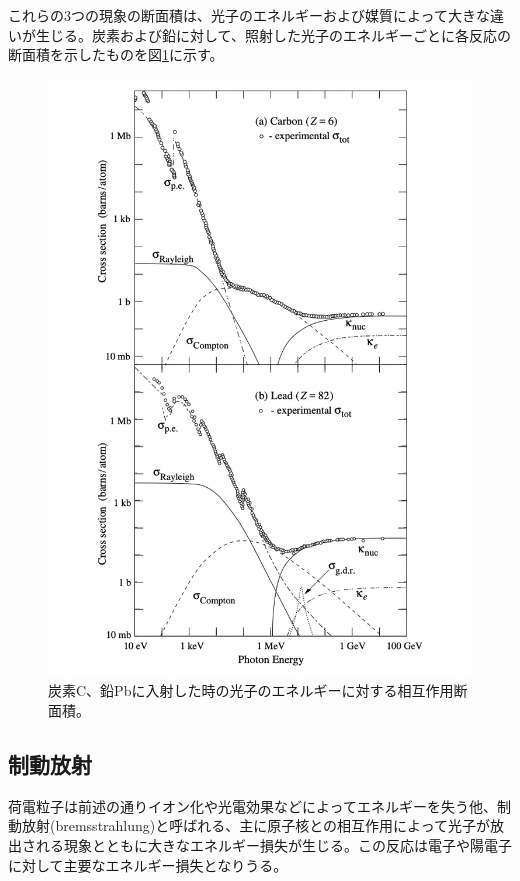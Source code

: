 これらの3つの現象の断面積は、光子のエネルギーおよび媒質によって大きな違いが生じる。炭素および鉛に対して、照射した光子のエネルギーごとに各反応の断面積を示したものを図\ref{photonInteract}に示す。

\begin{figure}[H]
	\begin{center}
		\includegraphics[width=370pt]{./Figure/EcalDetector/PhotonInteract.png}
		\caption[光子のエネルギーに対する相互作用断面積]{炭素C、鉛Pbに入射した時の光子のエネルギーに対する相互作用断面積\cite{PDG_Interaction}。}
		\label{photonInteract}
	\end{center}
\end{figure}


\subsection{制動放射}
荷電粒子は前述の通りイオン化や光電効果などによってエネルギーを失う他、制動放射(bremsstrahlung)と呼ばれる、主に原子核との相互作用によって光子が放出される現象とともに大きなエネルギー損失が生じる。この反応は電子や陽電子に対して主要なエネルギー損失となりうる。

